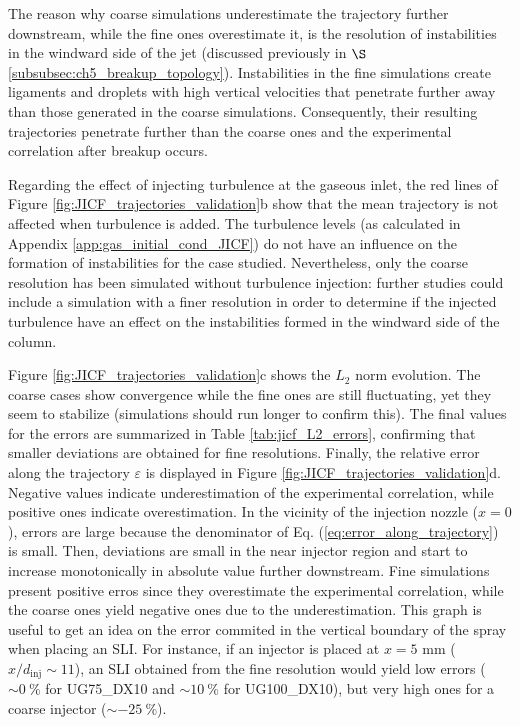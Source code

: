 \vspace*{-0.05in}

The reason why coarse simulations underestimate the trajectory further downstream, while the fine ones overestimate it, is the resolution of instabilities in the windward side of the jet (discussed previously in $\S$\ref{subsubsec:ch5_breakup_topology}).  Instabilities in the fine simulations create ligaments and droplets with high vertical velocities that penetrate further away than those generated in the coarse simulations. Consequently, their resulting trajectories penetrate further than the coarse ones and the experimental correlation after breakup occurs. 


Regarding the effect of injecting turbulence at the gaseous inlet, the red lines of Figure \ref{fig:JICF_trajectories_validation}b show that the mean trajectory is not affected when turbulence is added. The turbulence levels (as calculated in Appendix \ref{app:gas_initial_cond_JICF}) do not have an influence on the formation of instabilities for the case studied. Nevertheless, only the coarse resolution has been simulated without turbulence injection: further studies could include a simulation with a finer resolution in order to determine if the injected turbulence have an effect on the instabilities formed in the windward side of the column.

Figure \ref{fig:JICF_trajectories_validation}c shows the $L_2$ norm evolution. The coarse cases show convergence while the fine ones are still fluctuating, yet they seem to stabilize (simulations should run longer to confirm this). The final values for the errors are summarized in Table \ref{tab:jicf_L2_errors}, confirming that smaller deviations are obtained for fine resolutions. Finally, the relative error along the trajectory $\varepsilon$ is displayed in Figure \ref{fig:JICF_trajectories_validation}d. Negative values indicate underestimation of the experimental correlation, while positive ones indicate overestimation. In the vicinity of the injection nozzle ($x = 0$), errors are large because the denominator of Eq. (\ref{eq:error_along_trajectory}) is small. Then, deviations are small in the near injector region and start to increase monotonically in absolute value further downstream. Fine simulations present positive erros since they overestimate the experimental correlation, while the coarse ones yield negative ones due to the underestimation. This graph is useful to get an idea on the error commited in the vertical boundary of the spray when placing an SLI. For instance, if an injector is placed at $x = 5$ mm ($x/d_\mathrm{inj} \sim 11$), an SLI obtained from the fine resolution would yield low errors ($\sim 0~\%$ for UG75\_DX10 and $\sim 10~\%$ for UG100\_DX10), but very high ones for a coarse injector ($\sim - 25~\%$). %



